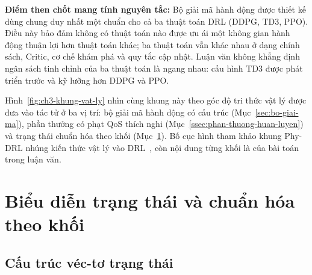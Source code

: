 

\textbf{Điểm then chốt mang tính nguyên tắc:} Bộ giải mã hành động được thiết kế dùng chung duy nhất một chuẩn
cho cả ba thuật toán DRL (DDPG, TD3, PPO). Điều này bảo đảm không có thuật toán nào được ưu ái một không gian
hành động thuận lợi hơn thuật toán khác; ba thuật toán vẫn khác nhau ở dạng chính sách, Critic, cơ chế khám phá
và quy tắc cập nhật. Luận văn không khẳng định ngân sách tinh chỉnh của ba thuật toán là ngang nhau: cấu hình
TD3 được phát triển trước và kỹ lưỡng hơn DDPG và PPO.

Hình~\ref{fig:ch3-khung-vat-ly} nhìn cùng khung này theo góc độ tri thức vật lý được đưa vào tác tử ở ba vị trí:
bộ giải mã hành động có cấu trúc (Mục~\ref{sec:bo-giai-ma}), phần thưởng có phạt QoS thích nghi
(Mục~\ref{ssec:phan-thuong-huan-luyen}) và trạng thái chuẩn hóa theo khối (Mục~\ref{sec:bieu-dien-trang-thai}).
Bố cục hình tham khảo khung Phy-DRL nhúng kiến thức vật lý vào DRL~\cite{Cao2024PhyDRL}, còn nội dung từng khối
là của bài toán trong luận văn.



\section{Biểu diễn trạng thái và chuẩn hóa theo khối}
\label{sec:bieu-dien-trang-thai}

\subsection{Cấu trúc véc-tơ trạng thái}
\label{ssec:cau-truc-trang-thai}

